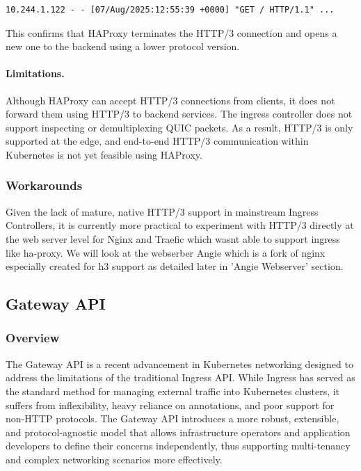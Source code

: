 \begin{lstlisting}[breaklines=true,basicstyle=\small\ttfamily,frame=single]
10.244.1.122 - - [07/Aug/2025:12:55:39 +0000] "GET / HTTP/1.1" ...
\end{lstlisting}

This confirms that HAProxy terminates the HTTP/3 connection and opens a new one to the backend using a lower protocol version.

\paragraph{Limitations.}
Although HAProxy can accept HTTP/3 connections from clients, it does not forward them using HTTP/3 to backend services. The ingress controller does not support inspecting or demultiplexing QUIC packets. As a result, HTTP/3 is only supported at the edge, and end-to-end HTTP/3 communication within Kubernetes is not yet feasible using HAProxy.



\subsubsection{Workarounds}
Given the lack of mature, native HTTP/3 support in mainstream Ingress Controllers, it is currently more practical to experiment with HTTP/3 directly at the web server level for Nginx and Traefic which wasnt able to support ingress like ha-proxy. We will look at the webserber Angie which is a fork of nginx especially created for h3 support as detailed later in 'Angie Webserver' section.

\subsection{Gateway API}
\subsubsection{Overview}
The Gateway API is a recent advancement in Kubernetes networking designed to address the limitations of the traditional Ingress API. While Ingress has served as the standard method for managing external traffic into Kubernetes clusters, it suffers from inflexibility, heavy reliance on annotations, and poor support for non-HTTP protocols. The Gateway API introduces a more robust, extensible, and protocol-agnostic model that allows infrastructure operators and application developers to define their concerns independently, thus supporting multi-tenancy and complex networking scenarios more effectively.


